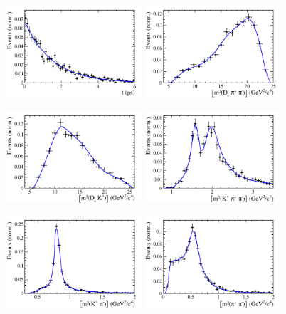 	
		\begin{figure}[hp]
	\centering
		\includegraphics[width=0.45\textwidth, height = !]{figs/plots_toy/h_t-eps-converted-to.pdf} 
		\includegraphics[width=0.45\textwidth, height = !]{figs/plots_toy/s_Dspipi-eps-converted-to.pdf} 
		
		\includegraphics[width=0.45\textwidth, height = !]{figs/plots_toy/s_DsK-eps-converted-to.pdf} 
		\includegraphics[width=0.45\textwidth, height = !]{figs/plots_toy/s_Kpipi-eps-converted-to.pdf}
		 
		\includegraphics[width=0.45\textwidth, height = !]{figs/plots_toy/s_Kpi-eps-converted-to.pdf} 
		\includegraphics[width=0.45\textwidth, height = !]{figs/plots_toy/s_pipi-eps-converted-to.pdf}
		

\end{figure}
